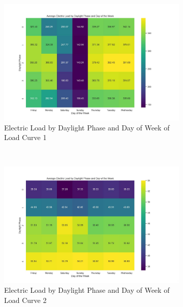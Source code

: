 \documentclass{article} %
\begin{document}
\begin{figure}[H]
    \centering
    \begin{subfigure}[b]{0.7\textwidth}
        \centering
        \includegraphics[width=\textwidth]{ressources/Daylight_Week/ElectricLoadDaylight(1).jpg}
        \caption{Electric Load by Daylight Phase and Day of Week of Load Curve 1}
        \label{fig:Daylight1}
    \end{subfigure}
    \\
    \begin{subfigure}[b]{0.7\textwidth}
        \centering
        \includegraphics[width=\textwidth]{ressources/Daylight_Week/ElectricLoadDaylight(2).jpg}
        \caption{Electric Load by Daylight Phase and Day of Week of Load Curve 2}
        \label{fig:Daylight2}
    \end{subfigure}
    \\
    \begin{subfigure}[b]{0.7\textwidth}

\end{subfigure}
\end{figure}
\end{document}
